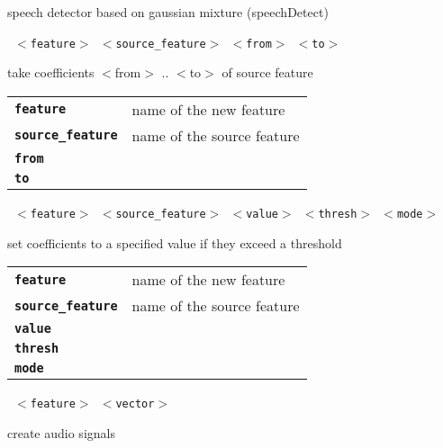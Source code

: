 \begin{description}
\begin{description}
        speech detector based on gaussian mixture (speechDetect)

       \texttt{ $<$feature$>$ $<$source\_feature$>$ $<$from$>$ $<$to$>$} \

        take coefficients $<$from$>$ .. $<$to$>$ of source feature

      \begin{tabular}{ll}
 \texttt{\textbf{feature}} &         name of the new feature \\
 \texttt{\textbf{source\_feature}} &  name of the source feature \\
 \texttt{\textbf{from}} &              \\
 \texttt{\textbf{to}} &                \\
      \end{tabular}
       \texttt{ $<$feature$>$ $<$source\_feature$>$ $<$value$>$ $<$thresh$>$ $<$mode$>$} \

        set coefficients to a specified value if they exceed a threshold

      \begin{tabular}{ll}
 \texttt{\textbf{feature}} &         name of the new feature \\
 \texttt{\textbf{source\_feature}} &  name of the source feature \\
 \texttt{\textbf{value}} &             \\
 \texttt{\textbf{thresh}} &            \\
 \texttt{\textbf{mode}} &              \\
      \end{tabular}
       \texttt{ $<$feature$>$ $<$vector$>$           } \

        create audio signals


\end{description}
\end{description}

